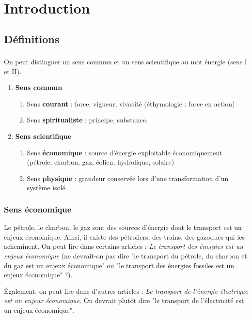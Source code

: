 \chapter{Introduction}
\section{Définitions}
\subsection{}
On peut distinguer un sens commun et un sens scientifique au mot énergie (sens I et II).

\begin{enumerate}[leftmargin=3cm, label=\Roman*{\bf .}]
\item {\bf Sens commun}
  \begin{enumerate}[label=\arabic*{\bf .}]
  \item Sens {\bf courant} : force, vigueur, vivacité (éthymologie : force en action)
  \item Sens {\bf spiritualiste} : principe, substance.
  \end{enumerate}
\item {\bf Sens scientifique}
  \begin{enumerate}[label=\arabic*{\bf .}]
  \item Sens {\bf économique} : source d'énergie exploitable économiquement (pétrole, charbon, gaz, éolien, hydrolique, solaire)
  \item Sens {\bf physique} : grandeur conservée lors d'une transformation d'un système isolé.
  \end{enumerate}
\end{enumerate}

\subsection{Sens économique}
Le pétrole, le charbon, le gaz sont des sources d'énergie dont le transport est un enjeux économique. Ainsi, il existe des pétroliers, des trains, des gazoducs qui les acheminent. On peut lire dans certains articles : {\it Le transport des énergies est un enjeux économique} (ne devrait-on pas dire "le transport du pétrole, du charbon et du gaz est un enjeux économique" ou "le transport des énergies fossiles est un enjeux économique" ?).

Également, on peut lire dans d'autres articles : {\it Le transport de l'énergie électrique est un enjeux économique}. On devrait plutôt dire "le transport de l'électricité est un enjeux économique".


